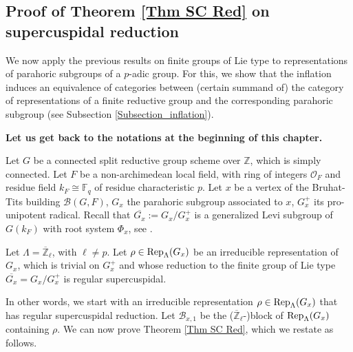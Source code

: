         
		
		
		
		
		
		
		
    \subsection{Proof of Theorem \ref{Thm SC Red} on supercuspidal reduction}
		
		We now apply the previous results on finite groups of Lie type to representations of parahoric subgroups of a $p$-adic group. For this, we show that the inflation induces an equivalence of categories between (certain summand of) the category of representations of a finite reductive group and the corresponding parahoric subgroup (see Subsection \ref{Subsection_inflation}). 
		
		\textbf{Let us get back to the notations at the beginning of this chapter.}
		
		Let $G$ be a connected split reductive group scheme over $\mathbb{Z}$, which is simply connected. Let $F$ be a non-archimedean local field, with ring of integers $\mathcal{O}_F$ and residue field $k_F \cong \mathbb{F}_q$ of residue characteristic $p$. Let $x$ be a vertex of the Bruhat-Tits building $\mathcal{B}(G, F)$, $G_x$ the parahoric subgroup associated to $x$, $G_x^+$ its pro-unipotent radical. Recall that $\overline{G_x}:=G_x/G_x^+$ is a generalized Levi subgroup of $G(k_F)$ with root system $\Phi_x$, see \cite[Theorem 3.17]{rabinoff2003bruhat}.
		
		Let $\Lambda=\overline{\mathbb{Z}}_{\ell}$, with $\ell \neq p$. Let $\rho \in \operatorname{\operatorname{Rep}}_{\Lambda}(G_x)$ be an irreducible representation of $G_x$, which is trivial on $G_x^+$ and whose reduction to the finite group of Lie type $\overline{G_x}=G_x/G_x^+$ is regular supercuspidal. 
		
		
		In other words, we start with an irreducible representation $\rho \in \operatorname{\operatorname{Rep}}_{\Lambda}(G_x)$ that has regular supercuspidal reduction. Let $\mathcal{B}_{x,1}$ be the ($\overline{\mathbb{Z}}_{\ell}$-)block of $\operatorname{\operatorname{Rep}}_{\Lambda}(G_x)$ containing $\rho$. We can now prove Theorem \ref{Thm SC Red}, which we restate as follows.
		
